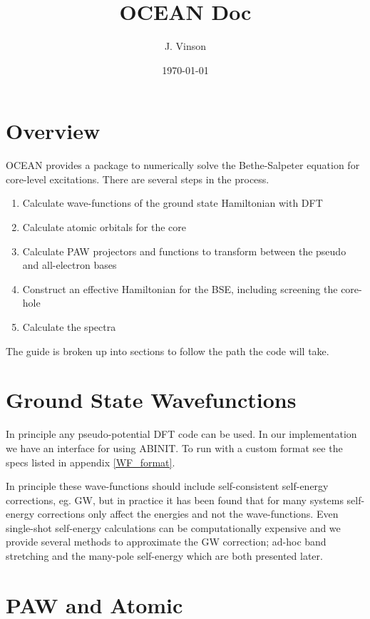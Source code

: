 \documentclass[12pt]{revtex4}
\begin{document}
\title{OCEAN Doc}

\author{J. Vinson}
\date{\today}

\maketitle

\section{Overview}

OCEAN provides a package to numerically solve the Bethe-Salpeter equation for core-level excitations. There are several steps in the process.
\begin{enumerate}
\item Calculate wave-functions of the ground state Hamiltonian with DFT
\item Calculate atomic orbitals for the core
\item Calculate PAW projectors and functions to transform between the pseudo and all-electron bases
\item Construct an effective Hamiltonian for the BSE, including screening the core-hole
\item Calculate the spectra
\end{enumerate}

The guide is broken up into sections to follow the path the code will take.

\section{Ground State Wavefunctions}
In principle any pseudo-potential DFT code can be used. In our implementation we have an interface for using ABINIT\cite{abinit}. To run with a custom format see the specs listed in appendix \ref{WF_format}.

In principle these wave-functions should include self-consistent self-energy corrections, eg. GW, but in practice it has been found that for many systems 
self-energy corrections only affect the energies and not the wave-functions. Even single-shot self-energy calculations can be computationally expensive 
and we provide several methods to approximate the GW correction; ad-hoc band stretching and the many-pole self-energy which are both presented 
later.


\section{PAW and Atomic}
\end{document}
